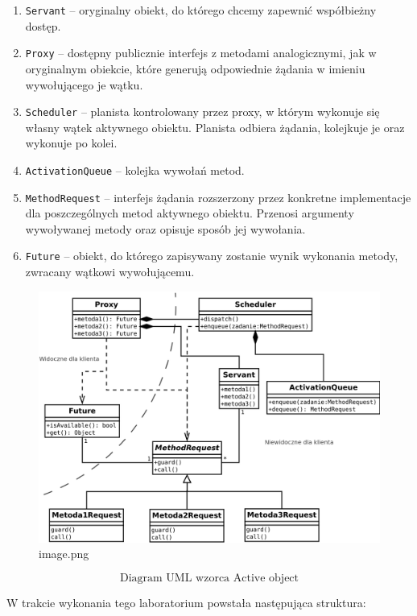 \documentclass[11pt]{article}
\providecommand{\tightlist}{%
      \setlength{\itemsep}{0pt}\setlength{\parskip}{0pt}}
\begin{document}
\begin{enumerate}
\def\labelenumi{\arabic{enumi}.}
\tightlist
\item
  \texttt{Servant} -- oryginalny obiekt, do którego chcemy zapewnić
  współbieżny dostęp.
\item
  \texttt{Proxy} -- dostępny publicznie interfejs z metodami
  analogicznymi, jak w oryginalnym obiekcie, które generują odpowiednie
  żądania w imieniu wywołującego je wątku.
\item
  \texttt{Scheduler} -- planista kontrolowany przez proxy, w którym
  wykonuje się własny wątek aktywnego obiektu. Planista odbiera żądania,
  kolejkuje je oraz wykonuje po kolei.
\item
  \texttt{ActivationQueue} -- kolejka wywołań metod.
\item
  \texttt{MethodRequest} -- interfejs żądania rozszerzony przez
  konkretne implementacje dla poszczególnych metod aktywnego obiektu.
  Przenosi argumenty wywoływanej metody oraz opisuje sposób jej
  wywołania.
\item
  \texttt{Future} -- obiekt, do którego zapisywany zostanie wynik
  wykonania metody, zwracany wątkowi wywołującemu.
\end{enumerate}

    \begin{figure}
\centering
\includegraphics{image.png}
\caption{image.png}
\end{figure}

\[ \text{Diagram UML wzorca Active object} \]

    W trakcie wykonania tego laboratorium powstała następująca struktura:
\end{document}
